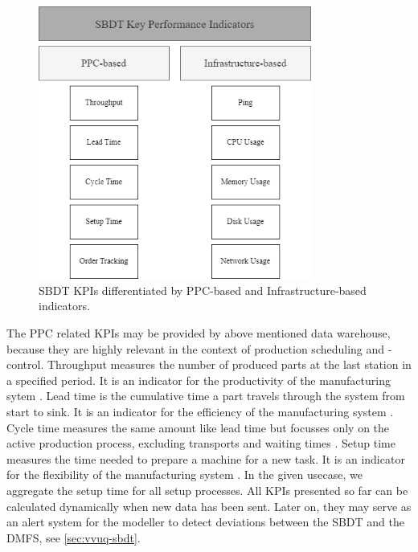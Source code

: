 \begin{figure}[htbp]
  \centering
  \includegraphics[width=0.8\textwidth]{figures/kpi.png}
  \caption{SBDT KPIs differentiated by PPC-based and Infrastructure-based indicators.}
  \label{fig:kpis}
\end{figure}

The PPC related KPIs may be provided by above mentioned data warehouse, because they are highly relevant in the context of production scheduling and -control. Throughput measures the number of produced parts at the last station in a specified period. It is an indicator for the productivity of the manufacturing sytem \autocite{imseitif2019throughput}. Lead time is the cumulative time a part travels through the system from start to sink. It is an indicator for the efficiency of the manufacturing system \autocite{pfeiffer2016manufacturing}. Cycle time measures the same amount like lead time but focusses only on the active production process, excluding transports and waiting times \autocite{griffin1993metrics}. Setup time measures the time needed to prepare a machine for a new task. It is an indicator for the flexibility of the manufacturing system \autocite{allahverdi2008significance}. In the given usecase, we aggregate the setup time for all setup processes. All KPIs presented so far can be calculated dynamically when new data has been sent. Later on, they may serve as an alert system for the modeller to detect deviations between the SBDT and the DMFS, see \autoref{sec:vvuq-sbdt}.

